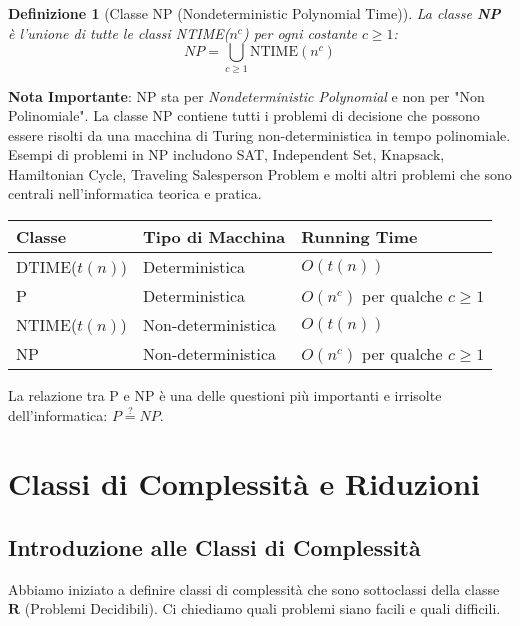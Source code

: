 \documentclass[a4paper, 11pt]{book} %
\newtheorem{definition}[theorem]{Definizione}
\theoremstyle{definition}
\begin{document}
\begin{definition}[Classe NP (Nondeterministic Polynomial Time)]
La classe \textbf{NP} è l'unione di tutte le classi NTIME($n^c$) per ogni costante $c \ge 1$:
\[ NP = \bigcup_{c \ge 1} \text{NTIME}(n^c) \]
\end{definition}
\textbf{Nota Importante}: NP sta per \emph{Nondeterministic Polynomial} e non per "Non Polinomiale". La classe NP contiene tutti i problemi di decisione che possono essere risolti da una macchina di Turing non-deterministica in tempo polinomiale.
Esempi di problemi in NP includono SAT, Independent Set, Knapsack, Hamiltonian Cycle, Traveling Salesperson Problem e molti altri problemi che sono centrali nell'informatica teorica e pratica.

\begin{center}
\begin{tabular}{|l|l|l|}
\hline
\textbf{Classe} & \textbf{Tipo di Macchina} & \textbf{Running Time} \\
\hline
DTIME($t(n)$) & Deterministica & $O(t(n))$ \\
P & Deterministica & $O(n^c)$ per qualche $c \ge 1$ \\
NTIME($t(n)$) & Non-deterministica & $O(t(n))$ \\
NP & Non-deterministica & $O(n^c)$ per qualche $c \ge 1$ \\
\hline
\end{tabular}
\end{center}

La relazione tra P e NP è una delle questioni più importanti e irrisolte dell'informatica: $P \stackrel{?}{=} NP$.



\chapter{Classi di Complessità e Riduzioni}



\section{Introduzione alle Classi di Complessità}

Abbiamo iniziato a definire classi di complessità che sono sottoclassi della classe $\mathbf{R}$ (Problemi Decidibili). Ci chiediamo quali problemi siano facili e quali difficili.
\end{document}
